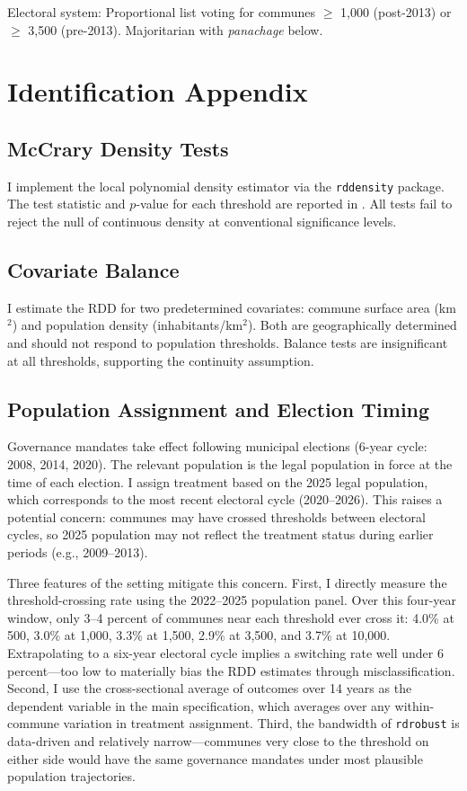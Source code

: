 \documentclass[12pt]{article}
\begin{document}
Electoral system: Proportional list voting for communes $\geq$ 1,000 (post-2013) or $\geq$ 3,500 (pre-2013). Majoritarian with \textit{panachage} below.

\section{Identification Appendix}
\label{app:identification}

\subsection{McCrary Density Tests}

I implement the \citet{cattaneo2020density} local polynomial density estimator via the \texttt{rddensity} package. The test statistic and $p$-value for each threshold are reported in . All tests fail to reject the null of continuous density at conventional significance levels.

\subsection{Covariate Balance}

I estimate the RDD for two predetermined covariates: commune surface area (km$^2$) and population density (inhabitants/km$^2$). Both are geographically determined and should not respond to population thresholds. Balance tests are insignificant at all thresholds, supporting the continuity assumption.

\subsection{Population Assignment and Election Timing}

Governance mandates take effect following municipal elections (6-year cycle: 2008, 2014, 2020). The relevant population is the legal population in force at the time of each election. I assign treatment based on the 2025 legal population, which corresponds to the most recent electoral cycle (2020--2026). This raises a potential concern: communes may have crossed thresholds between electoral cycles, so 2025 population may not reflect the treatment status during earlier periods (e.g., 2009--2013).

Three features of the setting mitigate this concern. First, I directly measure the threshold-crossing rate using the 2022--2025 population panel. Over this four-year window, only 3--4 percent of communes near each threshold ever cross it: 4.0\% at 500, 3.0\% at 1,000, 3.3\% at 1,500, 2.9\% at 3,500, and 3.7\% at 10,000. Extrapolating to a six-year electoral cycle implies a switching rate well under 6 percent---too low to materially bias the RDD estimates through misclassification. Second, I use the cross-sectional average of outcomes over 14 years as the dependent variable in the main specification, which averages over any within-commune variation in treatment assignment. Third, the bandwidth of \texttt{rdrobust} is data-driven and relatively narrow---communes very close to the threshold on either side would have the same governance mandates under most plausible population trajectories.
\end{document}
